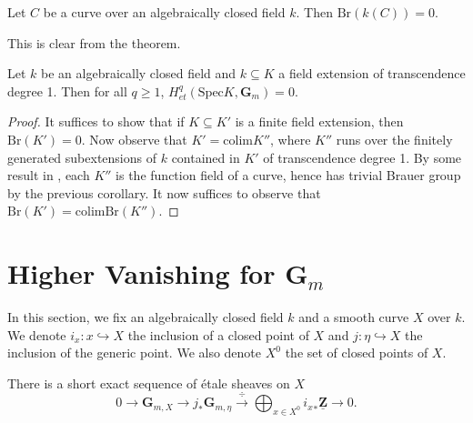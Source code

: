 \begin{lemma}
\label{lemma-curve-brauer-zero}
Let $C$ be a curve over an algebraically closed field $k$. Then 
$\text{Br}(k(C)) = 0$.
\end{lemma}

\noindent
This is clear from the theorem.

\begin{lemma} \label{cor:HqGmKvanishes}
Let $k$ be an algebraically closed field and $k \subseteq K$ a field extension 
of transcendence degree 1. Then for all $q \geq 1$, $H_{et}^q(\text{Spec} K, 
\mathbf{G}_m) = 0$.
\end{lemma}

\begin{proof}
It suffices to show that if $K \subseteq K'$ is a finite field extension, then 
$\text{Br}(K') = 0$. Now observe that $K' = \text{colim} K''$, where $K''$ runs 
over the finitely generated subextensions of $k$ contained in $K'$ of 
transcendence degree 1. By some result in \cite{H}, each $K''$ is the function 
field of a curve, hence has trivial Brauer group by the previous  corollary. It 
now suffices to observe that $\text{Br}(K') = \text{colim} \text{Br}(K'')$.
\end{proof}

\section{Higher Vanishing for $\mathbf{G}_m$}
\label{section-higher-Gm}

\noindent
In this section, we fix an algebraically closed field $k$ and a smooth curve 
$X$ over $k$. We denote $i_x : x \hookrightarrow X$ the inclusion of a closed 
point of $X$ and $j : \eta \hookrightarrow X$ the inclusion of the generic 
point. We also denote $X^0$ the set of closed points of $X$. 

\begin{theorem}
There is a short exact sequence of \'etale sheaves on $X$
$$
0 \longrightarrow \mathbf{G}_{m,X} \longrightarrow j_* \mathbf{G}_{m,\eta} 
\xrightarrow{\ \div\ } \bigoplus_{x \in X^0} {i_x}_* \underline{\mathbf{Z}} 
\longrightarrow 0.
$$
\end{theorem}

